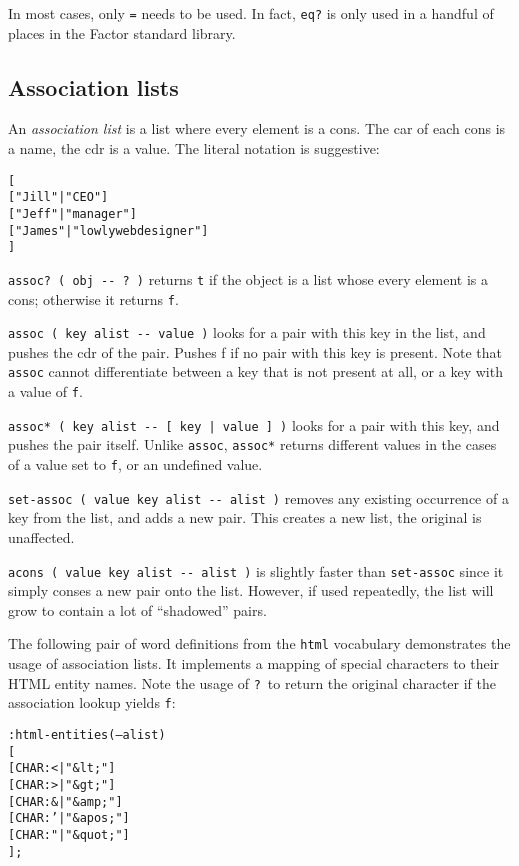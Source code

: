 \documentclass[english]{article}
\begin{document}
{In most cases, only \texttt{=} needs to be used. In fact, \texttt{eq?} is only used in a handful of places in the Factor standard library.

\subsection{Association lists}

An \emph{association list} is a list where every element is a cons. The
car of each cons is a name, the cdr is a value. The literal notation
is suggestive:

\begin{alltt}
{[}
    {[} "Jill"  | "CEO" {]}
    {[} "Jeff"  | "manager" {]}
    {[} "James" | "lowly web designer" {]}
{]}
\end{alltt}

\texttt{assoc? ( obj -{}- ?~)} returns \texttt{t} if the object is
a list whose every element is a cons; otherwise it returns \texttt{f}.

\texttt{assoc ( key alist -{}- value )} looks for a pair with this
key in the list, and pushes the cdr of the pair. Pushes f if no pair
with this key is present. Note that \texttt{assoc} cannot differentiate between
a key that is not present at all, or a key with a value of \texttt{f}.

\texttt{assoc{*} ( key alist -{}- {[} key | value {]} )} looks for
a pair with this key, and pushes the pair itself. Unlike \texttt{assoc},
\texttt{assoc{*}} returns different values in the cases of a value
set to \texttt{f}, or an undefined value.

\texttt{set-assoc ( value key alist -{}- alist )} removes any existing
occurrence of a key from the list, and adds a new pair. This creates
a new list, the original is unaffected.

\texttt{acons ( value key alist -{}- alist )} is slightly faster
than \texttt{set-assoc} since it simply conses a new pair onto the
list. However, if used repeatedly, the list will grow to contain a
lot of {}``shadowed'' pairs.

The following pair of word definitions from the \texttt{html} vocabulary demonstrates the usage of association lists. It implements a mapping of special characters to their HTML entity names. Note the usage of \texttt{?}~to return the original character if the association lookup yields \texttt{f}:

\begin{alltt}
: html-entities ( -- alist )
    {[}
        {[} CHAR: < | "\&lt;"   {]}
        {[} CHAR: > | "\&gt;"   {]}
        {[} CHAR: \& | "\&amp;"  {]}
        {[} CHAR: {'} | "\&apos;" {]}
        {[} CHAR: {"} | "\&quot;" {]}
    {]} ;


\end{alltt}}
\end{document}
